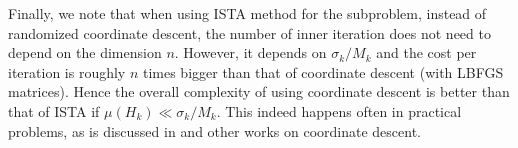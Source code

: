 \documentclass[11pt]{article}
\numberwithin{equation}{section}
\begin{document}
   Finally, we note that when using ISTA method for the subproblem, instead of randomized coordinate descent, 
   the number of inner iteration does not need to depend on the dimension $n$. However, 
   it depends on $\sigma_k/M_k$ and the cost per iteration is roughly $n$ times bigger than that of coordinate descent (with LBFGS matrices). 
   Hence the overall complexity of using coordinate descent is better than that of ISTA if $\mu(H_k)\ll \sigma_k/M_k$. 
   This indeed happens often in practical problems, as is discussed in \cite{Richtarik2012} and other works on coordinate descent. 

 
%
%
%
%
%
%
\end{document}
